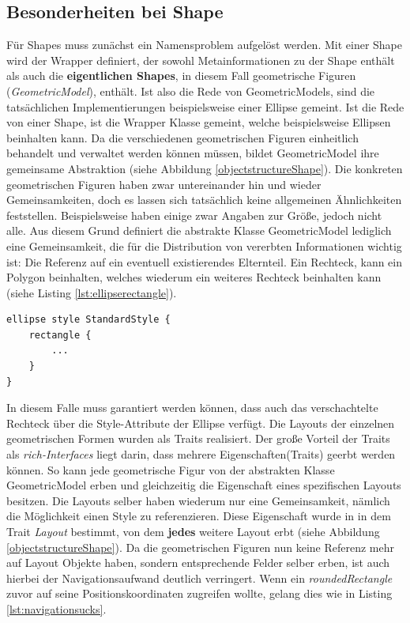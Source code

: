 \subsection{Besonderheiten bei Shape}
Für Shapes muss zunächst ein Namensproblem aufgelöst werden. Mit einer Shape wird der Wrapper definiert, der sowohl Metainformationen zu der Shape enthält als auch die \textbf{eigentlichen Shapes}, in diesem Fall geometrische Figuren (\textit{GeometricModel}), enthält. Ist also die Rede von GeometricModels, sind die tatsächlichen Implementierungen beispielsweise einer Ellipse gemeint. Ist die Rede von einer Shape, ist die Wrapper Klasse gemeint, welche beispielsweise Ellipsen beinhalten kann. Da die verschiedenen geometrischen Figuren einheitlich behandelt und verwaltet werden können müssen, bildet GeometricModel ihre gemeinsame Abstraktion (siehe Abbildung \ref{objectstructureShape}). Die konkreten geometrischen Figuren haben zwar untereinander hin und wieder Gemeinsamkeiten, doch es lassen sich tatsächlich keine allgemeinen Ähnlichkeiten feststellen. Beispielsweise haben einige zwar Angaben zur Größe, jedoch nicht alle. Aus diesem Grund definiert die abstrakte Klasse GeometricModel lediglich eine Gemeinsamkeit, die für die Distribution von vererbten Informationen wichtig ist: Die Referenz auf ein eventuell existierendes Elternteil. Ein Rechteck, kann ein Polygon beinhalten, welches wiederum ein weiteres Rechteck beinhalten kann (siehe Listing \ref{lst:ellipserectangle}).
\begin{lstlisting}[style=spray, caption = {Beispiel Ellipse die einer Styleregel unterliegt und ein Rechteck beinhaltet}, label = {lst:ellipserectangle}]
ellipse style StandardStyle {
    rectangle {
        ...
    }
}
\end{lstlisting}
In diesem Falle muss garantiert werden können, dass auch das verschachtelte Rechteck über die Style-Attribute der Ellipse verfügt.
Die Layouts der einzelnen geometrischen Formen wurden als Traits realisiert. Der große Vorteil der Traits als \textit{rich-Interfaces} liegt darin, dass mehrere Eigenschaften(Traits) geerbt werden können. So kann jede geometrische Figur von der abstrakten Klasse GeometricModel erben und gleichzeitig die Eigenschaft eines spezifischen Layouts besitzen.
Die Layouts selber haben wiederum nur eine Gemeinsamkeit, nämlich die Möglichkeit einen Style zu referenzieren. Diese Eigenschaft wurde in in dem Trait \textit{Layout} bestimmt, von dem \textbf{jedes} weitere Layout erbt (siehe Abbildung \ref{objectstructureShape}). Da die geometrischen Figuren nun keine Referenz mehr auf Layout Objekte haben, sondern entsprechende Felder selber erben, ist auch hierbei der Navigationsaufwand deutlich verringert. Wenn ein \textit{roundedRectangle} zuvor auf seine Positionskoordinaten zugreifen wollte, gelang dies wie in Listing \ref{lst:navigationsucks}.
